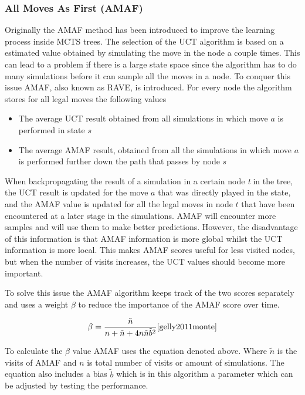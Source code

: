 \documentclass{ba-kecs}
\begin{document}
\subsubsection{All Moves As First (AMAF)}
Originally the AMAF method has been introduced to improve the learning process inside MCTS trees. The selection of the UCT algorithm is based on a estimated value obtained by simulating the move in the node a couple times. This can lead to a problem if there is a large state space since the algorithm has to do many simulations before it can sample all the moves in a node. To conquer this issue AMAF, also known as RAVE, is introduced.
For every node the algorithm stores for all legal moves the following values 
\begin{itemize}
	\item The average UCT result obtained from all simulations in which move $a$ is performed in state $s$
	\item The average AMAF result, obtained from all the simulations in which move $a$ is performed further down the path that passes by node $s$
\end{itemize}
When backpropagating the result of a simulation in a certain node \textit{t} in the tree, the UCT result is updated for the move $a$ that was directly played in the state, and the AMAF value is updated for all the legal moves in node $t$ that have been encountered at a later stage in the simulations. AMAF will encounter more samples and will use them to make better predictions. However, the disadvantage of this information is that AMAF information is more global whilst the UCT information is more local. This makes AMAF scores useful for less visited nodes, but when the number of visits increases, the UCT values should become more important. \cite{sironicomparison}

To solve this issue the AMAF algorithm keeps track of the two scores separately and uses a weight $\beta$ to reduce the importance of the AMAF score over time. 

\begin{center}
	\begin{equation*}
    \beta = \frac{\tilde{n}}{n+\tilde{n} + 4n\tilde{n}\tilde{b}^2} 	\cite{gelly2011monte}
	\end{equation*}
\end{center}

To calculate the $\beta$ value AMAF uses the equation denoted above. Where $\tilde{n}$ is the visits of AMAF and $n$ is total number of visits or amount of simulations. The equation also includes a bias $\tilde{b}$ which is in this algorithm a parameter which can be adjusted by testing the performance. \cite{gelly2011monte}
\end{document}
